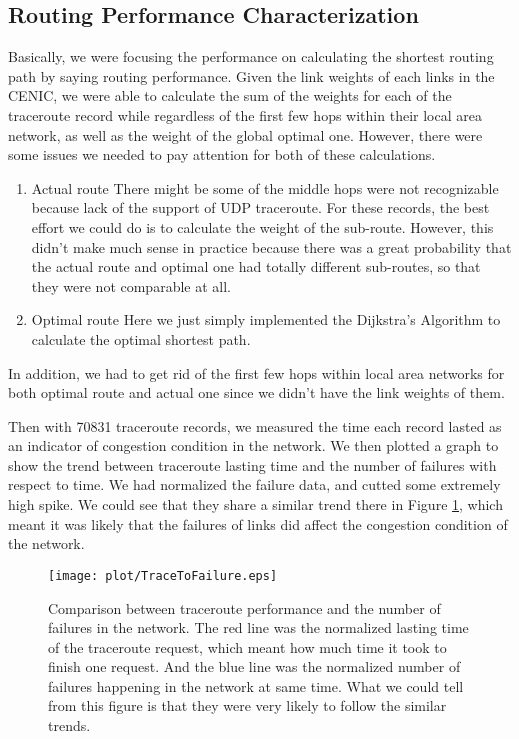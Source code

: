\documentclass[conference, twocolumn, oneside, 10pt]{IEEEtran}
\begin{document}
\subsection{Routing Performance Characterization}

Basically, we were focusing the performance on calculating the shortest routing path by saying routing performance. Given the link weights of each links in the CENIC, we were able to calculate the sum of the weights for each of the traceroute record while regardless of the first few hops within their local area network, as well as the weight of the global optimal one. However, there were some issues we needed to pay attention for both of these calculations.

\begin{enumerate}

\item{Actual route} There might be some of the middle hops were not recognizable because lack of the support of UDP traceroute. For these records, the best effort we could do is to calculate the weight of the sub-route. However, this didn't make much sense in practice because there was a great probability that the actual route and optimal one had totally different sub-routes, so that they were not comparable at all.

\item{Optimal route} Here we just simply implemented the Dijkstra's Algorithm to calculate the optimal shortest path.

\end{enumerate}

In addition, we had to get rid of the first few hops within local area networks for both optimal route and actual one since we didn't have the link weights of them.

Then with 70831 traceroute records, we measured the time each record lasted as an indicator of congestion condition in the network. We then plotted a graph to show the trend between traceroute lasting time and the number of failures with respect to time. We had normalized the failure data, and cutted some extremely high spike. We could see that they share a similar trend there in Figure \ref{fig:TraceToFailure}, which meant it was likely that the failures of links did affect the congestion condition of the network.

\begin{figure}[h!]
\centering
\texttt{[image: plot/TraceToFailure.eps]}
\caption{Comparison between traceroute performance and the number of failures in the network. The red line was the normalized lasting time of the traceroute request, which meant how much time it took to finish one request. And the blue line was the normalized number of failures happening in the network at same time. What we could tell from this figure is that they were very likely to follow the similar trends.}
\label{fig:TraceToFailure}
\end{figure}
\end{document}
